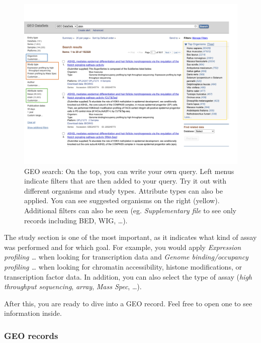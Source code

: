 \documentclass[
]{book}
\begin{document}
\begin{figure}
\centering
\includegraphics{figures/GEOfilters.png}
\caption{GEO search: On the top, you can write your own query. Left menus indicate filters that are then added to your query. Try it out with different organisms and study types. Attribute types can also be applied. You can see suggested organisms on the right (yellow). Additional filters can also be seen (eg. \emph{Supplementary file} to see only records including BED, WIG, \ldots).}
\end{figure}

The study section is one of the most important, as it indicates what kind of assay was performed and for which goal. For example, you would apply \emph{Expression profiling \ldots{}} when looking for transcription data and \emph{Genome binding/occupancy profiling \ldots{} } when looking for chromatin accessibility, histone modifications, or transcription factor data. In addition, you can also select the type of assay (\emph{high throughput sequencing}, \emph{array}, \emph{Mass Spec}, \ldots).

After this, you are ready to dive into a GEO record. Feel free to open one to see information inside.

\hypertarget{geo-records}{%
\subsubsection{GEO records}\label{geo-records}}
\end{document}
